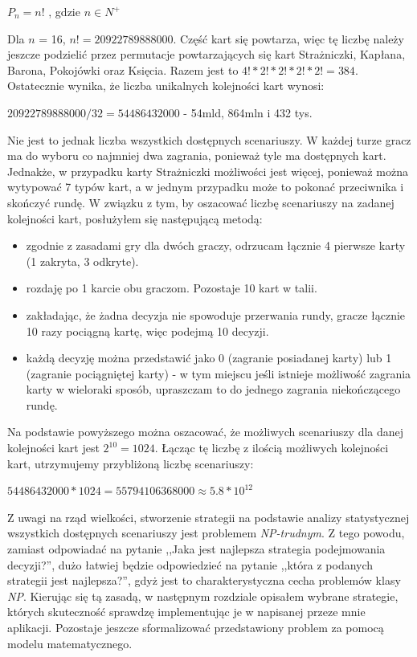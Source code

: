 \begin{center}
	$P_n = n!$ , gdzie $n\in N^+$
\end{center}

Dla  $n$ = 16, $n!=20 922 789 888 000$. Część kart się powtarza, więc tę liczbę należy jeszcze podzielić przez permutacje powtarzających się kart Strażniczki, Kapłana, Barona, Pokojówki oraz Księcia. Razem jest to $4! * 2! * 2! * 2! * 2! =  384$. Ostatecznie wynika, że liczba unikalnych kolejności kart wynosi: 

\begin{center}
	$20 922 789 888 000 / 32 = 54486432000$ - 54mld, 864mln i 432 tys.
\end{center}

Nie jest to jednak liczba wszystkich dostępnych scenariuszy. W każdej turze gracz ma do wyboru co najmniej dwa zagrania, ponieważ tyle ma dostępnych kart. Jednakże, w przypadku karty Strażniczki możliwości jest więcej, ponieważ można wytypować 7 typów kart, a w jednym przypadku może to pokonać przeciwnika i skończyć rundę. W związku z tym, by oszacować liczbę scenariuszy na zadanej kolejności kart, posłużyłem się następującą metodą:
\begin{itemize}
	\item zgodnie z zasadami gry dla dwóch graczy, odrzucam łącznie 4 pierwsze karty (1 zakryta, 3 odkryte).
	\item rozdaję po 1 karcie obu graczom. Pozostaje 10 kart w talii.
	\item zakładając, że żadna decyzja nie spowoduje przerwania rundy, gracze łącznie 10 razy pociągną kartę, więc podejmą 10 decyzji.
	\item każdą decyzję można przedstawić jako 0 (zagranie posiadanej karty) lub 1 (zagranie pociągniętej karty) - w tym miejscu jeśli istnieje możliwość zagrania karty w wieloraki sposób, upraszczam to do jednego zagrania niekończącego rundę.
\end{itemize}
Na podstawie powyższego można oszacować, że możliwych scenariuszy dla danej kolejności kart jest $2^{10}=1024$. Łącząc tę liczbę z ilością możliwych kolejności kart, utrzymujemy przybliżoną liczbę scenariuszy:

\begin{center}
	$54486432000 * 1024 = 55794106368000 \approx  5.8*10^{12}$
\end{center}

Z uwagi na rząd wielkości, stworzenie strategii na podstawie analizy statystycznej wszystkich dostępnych scenariuszy jest problemem \textit{NP-trudnym}. Z tego powodu, zamiast odpowiadać na pytanie ,,Jaka jest najlepsza strategia podejmowania decyzji?'', dużo łatwiej będzie odpowiedzieć na pytanie ,,która z podanych strategii jest najlepsza?'', gdyż jest to charakterystyczna cecha problemów klasy \textit{NP}. Kierując się tą zasadą, w następnym rozdziale opisałem wybrane strategie, których skuteczność sprawdzę implementując je w napisanej przeze mnie aplikacji. Pozostaje jeszcze sformalizować przedstawiony problem za pomocą modelu matematycznego.



